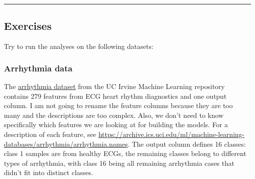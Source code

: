 \documentclass[]{article}
\newenvironment{Shaded}{\begin{snugshade}}{\end{snugshade}}
\newcommand{\KeywordTok}[1]{\textcolor[rgb]{0.13,0.29,0.53}{\textbf{{#1}}}}
\newcommand{\DataTypeTok}[1]{\textcolor[rgb]{0.13,0.29,0.53}{{#1}}}
\newcommand{\DecValTok}[1]{\textcolor[rgb]{0.00,0.00,0.81}{{#1}}}
\newcommand{\StringTok}[1]{\textcolor[rgb]{0.31,0.60,0.02}{{#1}}}
\newcommand{\CommentTok}[1]{\textcolor[rgb]{0.56,0.35,0.01}{\textit{{#1}}}}
\newcommand{\OtherTok}[1]{\textcolor[rgb]{0.56,0.35,0.01}{{#1}}}
\newcommand{\NormalTok}[1]{{#1}}
\begin{document}
\begin{center}\rule{0.5\linewidth}{\linethickness}\end{center}

\subsection{Exercises}\label{exercises}

Try to run the analyses on the following datasets:

\subsubsection{Arrhythmia data}\label{arrhythmia-data}

The \href{https://archive.ics.uci.edu/ml/datasets/Arrhythmia}{arrhythmia
dataset} from the UC Irvine Machine Learning repository contains 279
features from ECG heart rhythm diagnostics and one output column. I am
not going to rename the feature columns because they are too many and
the descriptions are too complex. Also, we don't need to know
specifically which features we are looking at for building the models.
For a description of each feature, see
\url{https://archive.ics.uci.edu/ml/machine-learning-databases/arrhythmia/arrhythmia.names}.
The output column defines 16 classes: class 1 samples are from healthy
ECGs, the remaining classes belong to different types of arrhythmia,
with class 16 being all remaining arrhythmia cases that didn't fit into
distinct classes.

\begin{Shaded}
\end{Shaded}
\end{document}
